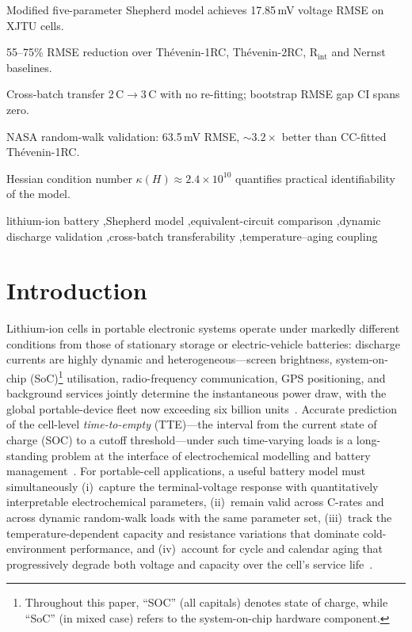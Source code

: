 \documentclass[5p,times,number]{elsarticle}
\begin{document}
\begin{frontmatter}
\begin{highlights}
\item Modified five-parameter Shepherd model achieves 17.85\,mV voltage RMSE on XJTU cells.
\item 55--75\% RMSE reduction over Th\'{e}venin-1RC, Th\'{e}venin-2RC, R$_{\mathrm{int}}$ and Nernst baselines.
\item Cross-batch transfer 2\,C$\to$3\,C with no re-fitting; bootstrap RMSE gap CI spans zero.
\item NASA random-walk validation: 63.5\,mV RMSE, $\sim 3.2\times$ better than CC-fitted Th\'{e}venin-1RC.
\item Hessian condition number $\kappa(H)\!\approx\!2.4\!\times\!10^{10}$ quantifies practical identifiability of the model.
\end{highlights}

\begin{keyword}
lithium-ion battery \sep Shepherd model \sep equivalent-circuit comparison \sep dynamic discharge validation \sep cross-batch transferability \sep temperature--aging coupling
\end{keyword}

\end{frontmatter}

\section{Introduction}\label{sec:intro}
Lithium-ion cells in portable electronic systems operate under markedly different conditions from those of stationary storage or electric-vehicle batteries: discharge currents are highly dynamic and heterogeneous---screen brightness, system-on-chip (SoC)\footnote{Throughout this paper, ``SOC'' (all capitals) denotes state of charge, while ``SoC'' (in mixed case) refers to the system-on-chip hardware component.} utilisation, radio-frequency communication, GPS positioning, and background services jointly determine the instantaneous power draw, with the global portable-device fleet now exceeding six billion units~\cite{Benkhelifa2016,Carroll2010,Chen2014}.
Accurate prediction of the cell-level \emph{time-to-empty} (TTE)---the interval from the current state of charge (SOC) to a cutoff threshold---under such time-varying loads is a long-standing problem at the interface of electrochemical modelling and battery management~\cite{Benkhelifa2016,Liu2019ECM}.
For portable-cell applications, a useful battery model must simultaneously (i)~capture the terminal-voltage response with quantitatively interpretable electrochemical parameters, (ii)~remain valid across C-rates and across dynamic random-walk loads with the same parameter set, (iii)~track the temperature-dependent capacity and resistance variations that dominate cold-environment performance, and (iv)~account for cycle and calendar aging that progressively degrade both voltage and capacity over the cell's service life~\cite{Liu2019ECM,Liu2018ECM,Vetter2005}.
\end{document}
